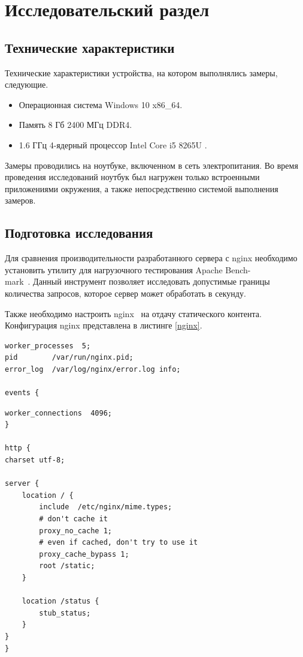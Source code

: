 \section{Исследовательский раздел}

\subsection{Технические характеристики}

Технические характеристики устройства, на котором выполнялись замеры, следующие.

\begin{itemize}[label=---]
	\item Операционная система Windows 10 \cite{oswind} x86\_64.
	\item Память 8 Гб 2400 МГц DDR4.
	\item 1.6 ГГц 4-ядерный процессор Intel Core i5 8265U \cite{intel}.
\end{itemize}

Замеры проводились на ноутбуке, включенном в сеть электропитания. Во время проведения исследований ноутбук был нагружен только встроенными приложениями окружения, а также непосредственно системой выполнения замеров.

\subsection{Подготовка исследования}

Для сравнения производительности разработанного сервера с nginx необходимо установить утилиту для нагрузочного тестирования Apache Bench-\\mark~\cite{ab}. Данный инструмент позволяет исследовать допустимые границы количества запросов, которое сервер может обработать в секунду.

Также необходимо настроить nginx~\cite{nginx} на отдачу статического контента. Конфигурация nginx представлена в листинге \ref{nginx}.

\begin{lstlisting}[caption={Конфигурация nginx}, label=nginx]
worker_processes  5;
pid        /var/run/nginx.pid;
error_log  /var/log/nginx/error.log info;

events {
\end{lstlisting}

\begin{lstlisting}[title={Окончание листинга \ref{nginx}}, label=nginx1, firstnumber=6]
  worker_connections  4096; 
}

http {
charset utf-8;

server { 
	location / {
		include  /etc/nginx/mime.types;
		# don't cache it
		proxy_no_cache 1;
		# even if cached, don't try to use it
		proxy_cache_bypass 1; 
		root /static;
	}
	
	location /status {
		stub_status;
	}
}
}
\end{lstlisting}

